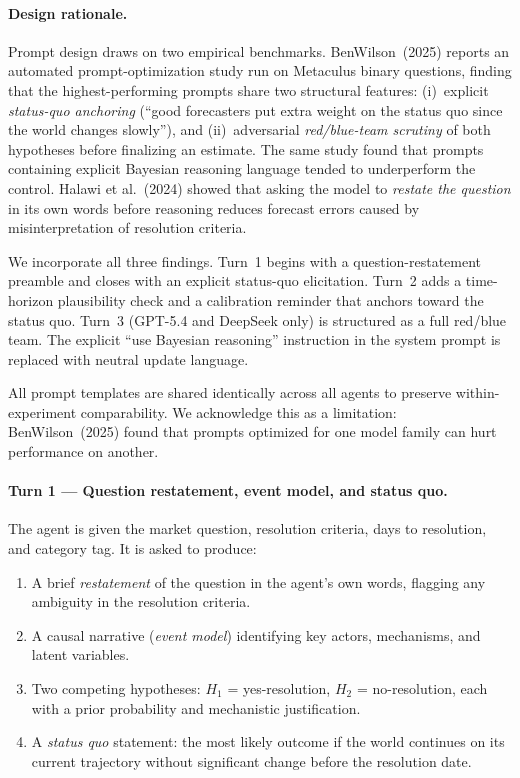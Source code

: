 \documentclass{article} %
\begin{document}
\paragraph{Design rationale.}
Prompt design draws on two empirical benchmarks.  BenWilson~(2025) reports an automated
prompt-optimization study run on Metaculus binary questions, finding that the
highest-performing prompts share two structural features: (i)~explicit \emph{status-quo
anchoring} (``good forecasters put extra weight on the status quo since the world changes
slowly''), and (ii)~adversarial \emph{red/blue-team scrutiny} of both hypotheses before
finalizing an estimate.  The same study found that prompts containing explicit Bayesian
reasoning language tended to underperform the control.  Halawi et al.~(2024) showed that
asking the model to \emph{restate the question} in its own words before reasoning reduces
forecast errors caused by misinterpretation of resolution criteria.

We incorporate all three findings.  Turn~1 begins with a question-restatement preamble
and closes with an explicit status-quo elicitation.  Turn~2 adds a time-horizon
plausibility check and a calibration reminder that anchors toward the status quo.
Turn~3 (GPT-5.4 and DeepSeek only) is structured as a full red/blue team.  The
explicit ``use Bayesian reasoning'' instruction in the system prompt is replaced with
neutral update language.

All prompt templates are shared identically across all agents to preserve
within-experiment comparability.  We acknowledge this as a limitation: BenWilson~(2025)
found that prompts optimized for one model family can hurt performance on another.

\paragraph{Turn 1 --- Question restatement, event model, and status quo.}
The agent is given the market question, resolution criteria, days to resolution, and
category tag.  It is asked to produce:
\begin{enumerate}
  \item A brief \emph{restatement} of the question in the agent's own words, flagging any
        ambiguity in the resolution criteria.
  \item A causal narrative (\textit{event model}) identifying key actors, mechanisms, and
        latent variables.
  \item Two competing hypotheses: $H_1$ = yes-resolution, $H_2$ = no-resolution, each
        with a prior probability and mechanistic justification.
  \item A \emph{status quo} statement: the most likely outcome if the world continues on
        its current trajectory without significant change before the resolution date.
\end{enumerate}
\end{document}
